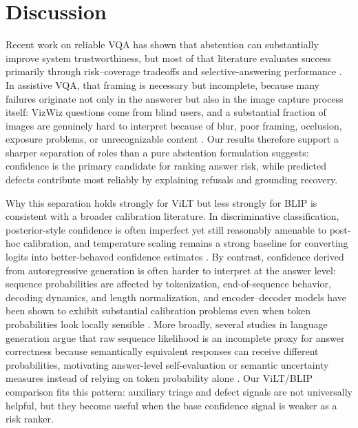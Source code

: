 \documentclass{ieeeaccess}
\newcommand{\vilt}{ViLT}
\newcommand{\blip}{BLIP}
\begin{document}
\section{Discussion}
\label{sec:discussion}

Recent work on reliable VQA has shown that abstention can substantially improve system trustworthiness, but most of that literature evaluates success primarily through risk--coverage tradeoffs and selective-answering performance \cite{whitehead2022reliable,dancette2023improving,eisenschlos2024selectively,khan2024consistency,srinivasan2024selective}. In assistive VQA, that framing is necessary but incomplete, because many failures originate not only in the answerer but also in the image capture process itself: VizWiz questions come from blind users, and a substantial fraction of images are genuinely hard to interpret because of blur, poor framing, occlusion, exposure problems, or unrecognizable content \cite{gurari2018vizwiz,chiu2020assessing}. Our results therefore support a sharper separation of roles than a pure abstention formulation suggests: confidence is the primary candidate for ranking answer risk, while predicted defects contribute most reliably by explaining refusals and grounding recovery.

Why this separation holds strongly for \vilt{} but less strongly for \blip{} is consistent with a broader calibration literature. In discriminative classification, posterior-style confidence is often imperfect yet still reasonably amenable to post-hoc calibration, and temperature scaling remains a strong baseline for converting logits into better-behaved confidence estimates \cite{guo2017calibration,desai2020calibration}. By contrast, confidence derived from autoregressive generation is often harder to interpret at the answer level: sequence probabilities are affected by tokenization, end-of-sequence behavior, decoding dynamics, and length normalization, and encoder--decoder models have been shown to exhibit substantial calibration problems even when token probabilities look locally sensible \cite{kumar2019calibration}. More broadly, several studies in language generation argue that raw sequence likelihood is an incomplete proxy for answer correctness because semantically equivalent responses can receive different probabilities, motivating answer-level self-evaluation or semantic uncertainty measures instead of relying on token probability alone \cite{kadavath2022language,kuhn2023semantic}. Our \vilt{}/\blip{} comparison fits this pattern: auxiliary triage and defect signals are not universally helpful, but they become useful when the base confidence signal is weaker as a risk ranker.
\end{document}
